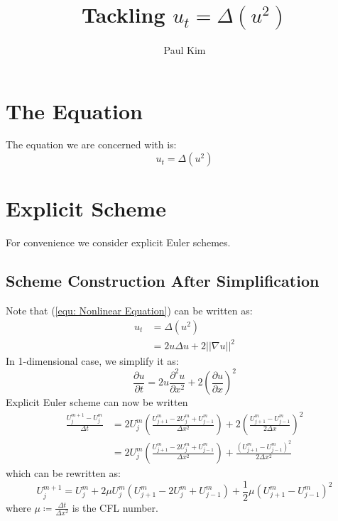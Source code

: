 \documentclass[a4paper]{article}
\title{Tackling $u_{t} = \Delta \left( u^2 \right)$}
\author{Paul Kim}
\begin{document}
\maketitle
\section{The Equation}
The equation we are concerned with is:
\begin{equation}
    u_{t} = \Delta \left( u^2 \right)
    \label{equ: Nonlinear Equation}
\end{equation}

\section{Explicit Scheme}
For convenience we consider explicit Euler schemes.

\subsection{Scheme Construction After Simplification}
Note that (\ref{equ: Nonlinear Equation}) can be written as:
\begin{align}
    u_t &= \Delta \left( u^2 \right) \\
    &= 2 u \Delta u + 2 || \nabla u ||^2
\end{align}
In 1-dimensional case, we simplify it as:
\begin{equation}
    \frac{\partial u}{\partial t} = 2 u \frac{\partial^2 u}{\partial x^2} + 2 \left( \frac{\partial u}{\partial x} \right)^2
\end{equation}
Explicit Euler scheme can now be written
\begin{align}
    \frac{U_j^{m+1} - U_j^m}{\Delta t}
    &= 2 U_j^m \left( \frac{U_{j+1}^m - 2 U_{j}^m + U_{j-1}^m}{\Delta x^2} \right)
    + 2 \left( \frac{U_{j+1}^m - U_{j-1}^m}{2 \Delta x} \right)^2 \\
    &= 2 U_j^m \left( \frac{U_{j+1}^m - 2 U_{j}^m + U_{j-1}^m}{\Delta x^2} \right)
    + \frac{\left( U_{j+1}^m - U_{j-1}^m \right)^2}{2 \Delta x^2}
\end{align}
which can be rewritten as:
\begin{equation}
    U_j^{m+1} = U_j^m + 2 \mu U_j^m \left( U_{j+1}^m - 2 U_{j}^m + U_{j-1}^m \right) 
    + \frac{1}{2} \mu \left( U_{j+1}^m - U_{j-1}^m \right)^2
\end{equation}
where $\mu \coloneqq \frac{\Delta t}{\Delta x^2}$ is the CFL number.
\end{document}
